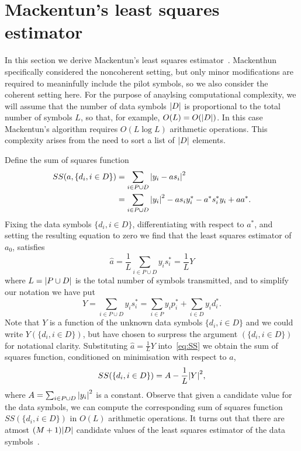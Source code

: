 \documentclass[journal]{IEEEtran}
\begin{document}
\section{Mackentun's least squares estimator}\label{sec:least-squar-estim}

In this section we derive Mackentun's least squares estimator~\cite{Mackenthun1994}.  Mackenthun specifically considered the noncoherent setting, but only minor modifications are required to meaninfully include the pilot symbols, so we also consider the coherent setting here.  For the purpose of anaylsing computational complexity, we will assume that the number of data symbols ${\left| D \right|}$ is proportional to the total number of symbols $L$, so that, for example, $O(L) = O({\left| D \right|})$.  In this case Mackentun's algorithm requires $O(L \log L)$ arithmetic operations.  This complexity arises from the need to sort a list of ${\left| D \right|}$ elements.  %

Define the sum of squares function
\begin{align}
SS(a, \{d_i, i \in D\}) &= \sum_{i \in P \cup D} {\left|  y_i - a s_i  \right|}^2 \nonumber \\
&= \sum_{i \in P \cup D} {\left| y_i \right|}^2 - a s_i y_i^* - a^* s_i^* y_i + aa^*. \label{eq:SS}
\end{align}
Fixing the data symbols $\{d_i, i \in D\}$, differentiating with respect to $a^*$, and setting the resulting equation to zero we find that the least squares estimator of $a_0$, satisfies
\begin{equation}\label{eq:hata}
\hat{a} = \frac{1}{L} \sum_{i \in P \cup D} y_i s_i^* = \frac{1}{L} Y
\end{equation}
where $L = {\left| P \cup D \right|}$ is the total number of symbols transmitted, and to simplify our notation we have put 
\[
Y = \sum_{i \in P \cup D} y_i s_i^* = \sum_{i \in P } y_i p_i^* + \sum_{i \in D } y_i d_i^*.
\]  
Note that $Y$ is a function of the unknown data symbols $\{ d_i, i \in D\}$ and we could write $Y(\{ d_i, i \in D\})$, but have chosen to surpress the argument $(\{ d_i, i \in D\})$ for notational clarity.  Substituting $\hat{a} = \frac{1}{L}Y$ into~\eqref{eq:SS} we obtain the sum of squares function, conditioned on minimisation with respect to $a$,
\begin{equation}\label{eq:SSdatasymbols}
SS(\{d_i, i \in D\}) = A - \frac{1}{L}{\left| Y \right|}^2,
\end{equation}
where $A = \sum_{i \in P \cup D}{\left| y_i \right|}^2$ is a constant.  Observe that given a candidate value for the data symbols, we can compute the corresponding sum of squares function $SS(\{d_i, i \in D\})$ in $O(L)$ arithmetic operations.  It turns out that there are atmost $(M+1){\left| D \right|}$ candidate values of the least squares estimator of the data symbols~\cite{Sweldens2001,Mackenthun1994}.  %
\end{document}
